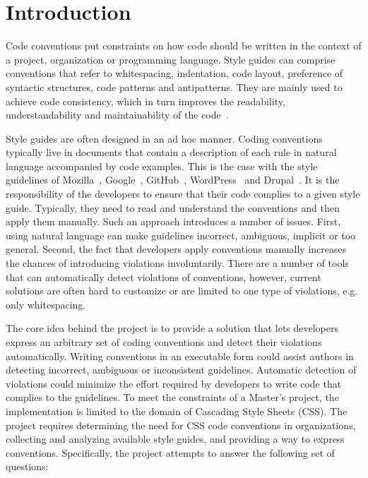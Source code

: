 \chapter{Introduction}

Code conventions put constraints on how code should be written in the context
of a project, organization or programming language. Style guides can comprise
conventions that refer to whitespacing, indentation, code layout, preference
of syntactic structures, code patterns and antipatterns. They are mainly used
to achieve code consistency, which in turn improves the readability,
understandability and maintainability of the
code~\cite{Buse2010,buse2010learning,tenny1988program}.

Style guides are often designed in an ad hoc manner. Coding conventions typically live in documents
that contain a description of each rule in natural language accompanied by code examples. This is
the case with the style guidelines of Mozilla~\cite{Mozilla}, Google~\cite{Google},
GitHub~\cite{GitHub}, WordPress~\cite{Wordpress} and Drupal~\cite{Drupal}. It is the responsibility
of the developers to ensure that their code complies to a given style guide. Typically, they need to
read and understand the conventions and then apply them manually. Such an approach introduces a
number of issues. First, using natural language can make guidelines incorrect, ambiguous, implicit
or too general. Second, the fact that developers apply conventions manually increases the chances of
introducing violations involuntarily. There are a number of tools that can automatically detect
violations of conventions, however, current solutions are often hard to customize or are limited to
one type of violations, e.g. only whitespacing.

The core idea behind the project is to provide a solution that lets developers express an arbitrary
set of coding conventions and detect their violations automatically. Writing conventions
in an executable form could assist authors in detecting incorrect, ambiguous or inconsistent
guidelines. Automatic detection of violations could minimize the effort required by developers to
write code that complies to the guidelines. To meet the constraints of a Master’s project, the
implementation is limited to the domain of Cascading Style Sheets (CSS). The project requires
determining the need for CSS code conventions in organizations, collecting and analyzing available
style guides, and providing a way to express conventions. Specifically, the project attempts to
answer the following set of questions:

